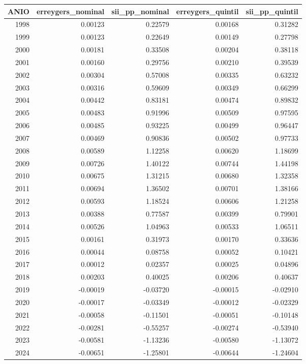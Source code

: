 \begin{tabular}{rrrrr}
\toprule
ANIO & erreygers\_nominal & sii\_pp\_nominal & erreygers\_quintil & sii\_pp\_quintil \\
\midrule
1998 & 0.00123 & 0.22579 & 0.00168 & 0.31282 \\
1999 & 0.00123 & 0.22649 & 0.00149 & 0.27798 \\
2000 & 0.00181 & 0.33508 & 0.00204 & 0.38118 \\
2001 & 0.00160 & 0.29756 & 0.00210 & 0.39539 \\
2002 & 0.00304 & 0.57008 & 0.00335 & 0.63232 \\
2003 & 0.00316 & 0.59609 & 0.00349 & 0.66299 \\
2004 & 0.00442 & 0.83181 & 0.00474 & 0.89832 \\
2005 & 0.00483 & 0.91996 & 0.00509 & 0.97595 \\
2006 & 0.00485 & 0.93225 & 0.00499 & 0.96447 \\
2007 & 0.00469 & 0.90836 & 0.00502 & 0.97733 \\
2008 & 0.00589 & 1.12258 & 0.00620 & 1.18699 \\
2009 & 0.00726 & 1.40122 & 0.00744 & 1.44198 \\
2010 & 0.00675 & 1.31215 & 0.00680 & 1.32358 \\
2011 & 0.00694 & 1.36502 & 0.00701 & 1.38166 \\
2012 & 0.00593 & 1.18524 & 0.00606 & 1.21258 \\
2013 & 0.00388 & 0.77587 & 0.00399 & 0.79901 \\
2014 & 0.00526 & 1.04963 & 0.00533 & 1.06511 \\
2015 & 0.00161 & 0.31973 & 0.00170 & 0.33636 \\
2016 & 0.00044 & 0.08758 & 0.00052 & 0.10421 \\
2017 & 0.00012 & 0.02357 & 0.00025 & 0.04896 \\
2018 & 0.00203 & 0.40025 & 0.00206 & 0.40637 \\
2019 & -0.00019 & -0.03720 & -0.00015 & -0.02910 \\
2020 & -0.00017 & -0.03349 & -0.00012 & -0.02329 \\
2021 & -0.00058 & -0.11501 & -0.00051 & -0.10148 \\
2022 & -0.00281 & -0.55257 & -0.00274 & -0.53940 \\
2023 & -0.00581 & -1.13236 & -0.00580 & -1.13072 \\
2024 & -0.00651 & -1.25801 & -0.00644 & -1.24604 \\
\bottomrule
\end{tabular}
